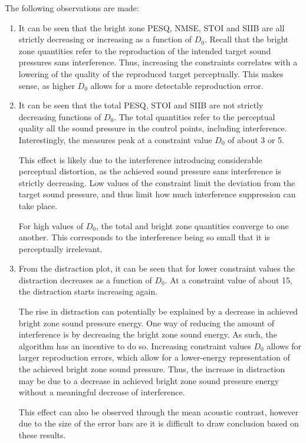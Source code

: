 The following observations are made:
\begin{enumerate}
    \item It can be seen that the bright zone PESQ, NMSE, STOI and SIIB are all strictly decreasing or increasing as a 
        function of $D_0$.
        Recall that the bright zone quantities refer to the reproduction of the intended target sound pressures sans 
        interference.
        Thus, increasing the constraints correlates with a lowering of the quality of the reproduced target
        perceptually.
        This makes sense, as higher $D_0$ allows for a more detectable reproduction error. 
        \label{obs:constrained:1}

    \item It can be seen that the total PESQ, STOI and SIIB are not strictly decreasing functions of $D_0$.
        The total quantities refer to the perceptual quality all the sound pressure in the control points,
        including interference.
        Interestingly, the measures peak at a constraint value $D_0$ of about 3 or 5. 

        This effect is likely due to the interference introducing considerable perceptual distortion,
        as the achieved sound pressure sans interference is strictly decreasing.
        Low values of the constraint limit the deviation from the target sound pressure, and thus limit how much 
        interference suppression can take place.

        For high values of $D_0$, the total and bright zone quantities converge to one another.
        This corresponds to the interference being so small that it is perceptually irrelevant.
        \label{obs:constrained:2}

    \item From the distraction plot, it can be seen that for lower constraint values the distraction decreases as 
        a function of $D_0$.
        At a constraint value of about 15, the distraction starts increasing again.

        The rise in distraction can potentially be explained by a decrease in achieved bright zone sound pressure energy.
        One way of reducing the amount of interference is by decreasing the bright zone sound energy.
        As such, the algorithm has an incentive to do so.
        Increasing constraint values $D_0$ allows for larger reproduction errors, which allow for a lower-energy
        representation of the achieved bright zone sound pressure.
        Thus, the increase in distraction may be due to a decrease in achieved bright zone sound pressure energy without
        a meaningful decrease of interference.

        This effect can also be observed through the mean acoustic contrast, however due to the size of the error bars are 
        it is difficult to draw conclusion based on these results.
        \label{obs:constrained:3}
\end{enumerate}
